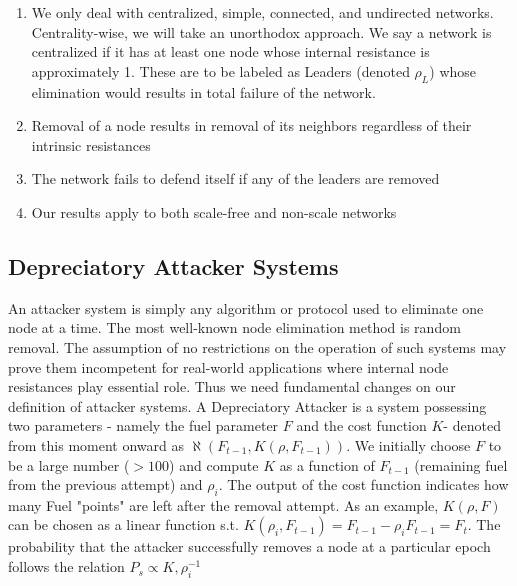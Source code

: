 \documentclass{article}
\begin{document}
	\begin{enumerate}
		\item {We only deal with centralized, simple, connected, and undirected networks.}
		Centrality-wise, we will take an unorthodox approach. We say a network is centralized if it has at least one node whose internal resistance is approximately 1. These are to be labeled as Leaders (denoted $\rho_L$) whose elimination would results in total failure of the network.
		\item {Removal of a node results in removal of its neighbors regardless of their intrinsic resistances}
		\item {The network fails to defend itself if any of the leaders are removed}
		\item {Our results apply to both scale-free and non-scale networks}
	\end{enumerate}
	
	\subsection{Depreciatory Attacker Systems}
	An attacker system is simply any algorithm or protocol used to eliminate one node at a time. The most well-known node elimination method is random removal. The assumption of no restrictions on the operation of such systems may prove them incompetent for real-world applications where internal node resistances play essential role. Thus we need fundamental changes on our definition of attacker systems. A Depreciatory Attacker is a system possessing two parameters - namely the fuel parameter $F$ and the cost function $K$- denoted from this moment onward as $\aleph(F_{t-1},K(\rho,F_{t-1}))$. We initially choose $F$ to be a large number ($>100$) and compute $K$ as a function of $F_{t-1}$ (remaining fuel from the previous attempt) and $\rho_i$. The output of the cost function indicates how many Fuel "points" are left after the removal attempt. As an example, $K(\rho,F)$ can be chosen as a linear function s.t. $K(\rho_i,F_{t-1})=F_{t-1} - \rho_i F_{t-1} = F_{t}$. 
	The probability that the attacker successfully removes a node at a particular epoch follows the relation $P_s \propto K, \rho_i^{-1}$
 
	\pagebreak
	
	
\end{document}

